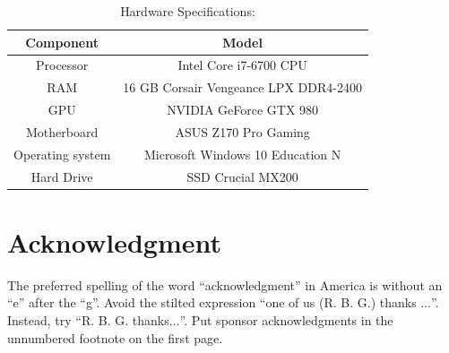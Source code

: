 \documentclass[conference]{IEEEtran}
\begin{document}
\begin{table}[htbp]
\caption{Hardware Specifications:}
\begin{center}
\begin{tabular}{|c|c|}
	\hline
	\textbf{Component} & \textbf{Model} \\
	\hline
	Processor & Intel Core i7-6700 CPU\\ \hline
	RAM & 16 GB Corsair Vengeance LPX DDR4-2400\\ \hline
	GPU & NVIDIA GeForce GTX 980 \\ \hline
	Motherboard & ASUS Z170 Pro Gaming \\ \hline
	Operating system & Microsoft Windows 10 Education N \\ \hline
	Hard Drive & SSD Crucial MX200 \\ \hline
\end{tabular}
\label{hardware}
\end{center}
\end{table}





\section*{Acknowledgment}

The preferred spelling of the word ``acknowledgment'' in America is without 
an ``e'' after the ``g''. Avoid the stilted expression ``one of us (R. B. 
G.) thanks $\ldots$''. Instead, try ``R. B. G. thanks$\ldots$''. Put sponsor 
acknowledgments in the unnumbered footnote on the first page.
\end{document}
